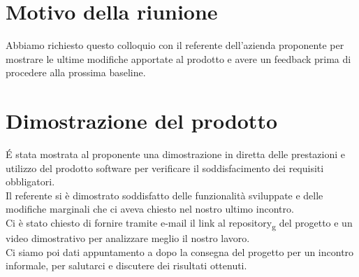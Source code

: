 \section{Motivo della riunione}
Abbiamo richiesto questo colloquio con il referente dell'azienda proponente per mostrare le ultime modifiche apportate al prodotto e avere un feedback prima di procedere alla prossima baseline.

\section{Dimostrazione del prodotto}
É stata mostrata al proponente una dimostrazione in diretta delle prestazioni e utilizzo del prodotto software per verificare il soddisfacimento dei requisiti obbligatori.\\
Il referente si è dimostrato soddisfatto delle funzionalità sviluppate e delle modifiche marginali che ci aveva chiesto nel nostro ultimo incontro.\\
Ci è stato chiesto di fornire tramite e-mail il link al repository\textsubscript{g} del progetto e un video dimostrativo per analizzare meglio il nostro lavoro.\\
Ci siamo poi dati appuntamento a dopo la consegna del progetto per un incontro informale, per salutarci e discutere dei risultati ottenuti.

